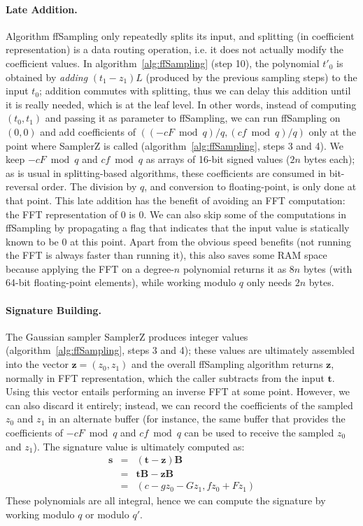 \documentclass{llncs}
\begin{document}
\paragraph{Late Addition.}
Algorithm \textsf{ffSampling} only repeatedly splits its input, and
splitting (in coefficient representation) is a data routing operation,
i.e. it does not actually modify the coefficient values. In
algorithm~\ref{alg:ffSampling} (step 10), the polynomial $t'_0$ is
obtained by \emph{adding} $(t_1 - z_1)L$ (produced by the previous
sampling steps) to the input $t_0$; addition commutes with splitting,
thus we can delay this addition until it is really needed, which is at
the leaf level. In other words, instead of computing $(t_0, t_1)$ and
passing it as parameter to \textsf{ffSampling}, we can run
\textsf{ffSampling} on $(0, 0)$ and add coefficients of $((-cF \bmod
q)/q, (cf \bmod q)/q)$ only at the point where \textsf{SamplerZ} is
called (algorithm~\ref{alg:ffSampling}, steps 3 and 4). We keep $-cF
\bmod q$ and $cf \bmod q$ as arrays of 16-bit signed values ($2n$ bytes
each); as is usual in splitting-based algorithms, these coefficients are
consumed in bit-reversal order. The division by $q$, and conversion to
floating-point, is only done at that point. This late addition has the
benefit of avoiding an FFT computation: the FFT representation of 0 is
0. We can also skip some of the computations in \textsf{ffSampling} by
propagating a flag that indicates that the input value is statically
known to be 0 at this point. Apart from the obvious speed benefits (not
running the FFT is always faster than running it), this also saves some
RAM space because applying the FFT on a degree-$n$ polynomial returns it
as $8n$ bytes (with 64-bit floating-point elements), while working
modulo $q$ only needs $2n$ bytes.

\paragraph{Signature Building.}
The Gaussian sampler \textsf{SamplerZ} produces integer values
(algorithm~\ref{alg:ffSampling}, steps 3 and 4); these values are
ultimately assembled into the vector $\mathbf{z} = (z_0, z_1)$ and the
overall \textsf{ffSampling} algorithm returns $\mathbf{z}$, normally in
FFT representation, which the caller subtracts from the input
$\mathbf{t}$. Using this vector entails performing an inverse FFT at
some point. However, we can also discard it entirely; instead, we can
record the coefficients of the sampled $z_0$ and $z_1$ in an alternate
buffer (for instance, the same buffer that provides the coefficients of
$-cF \bmod q$ and $cf \bmod q$ can be used to receive the sampled $z_0$
and $z_1$). The signature value is ultimately computed as:
\begin{eqnarray*}
    \mathbf{s} &=& (\mathbf{t} - \mathbf{z})\mathbf{B} \\
        &=& \mathbf{t}\mathbf{B} - \mathbf{z}\mathbf{B} \\
        &=& (c - g z_0 - G z_1, f z_0 + F z_1)
\end{eqnarray*}
These polynomials are all integral, hence we can compute the signature
by working modulo $q$ or modulo $q'$.
\end{document}
